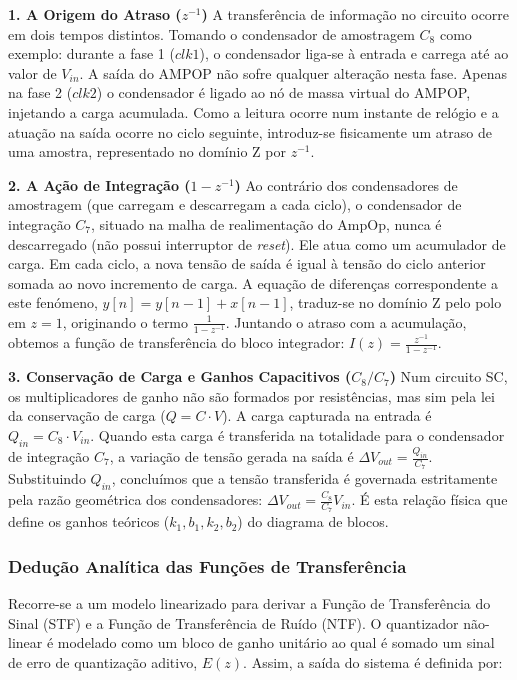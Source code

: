 \textbf{1. A Origem do Atraso ($z^{-1}$)}
A transferência de informação no circuito ocorre em dois tempos distintos. Tomando o condensador de
amostragem $C_8$ como exemplo: durante a fase 1 ($clk1$), o condensador liga-se à entrada e carrega até ao
valor de $V_{in}$. A saída do AMPOP não sofre qualquer alteração nesta fase.
Apenas na fase 2 ($clk2$) o condensador é ligado ao nó de massa virtual do AMPOP, injetando a carga acumulada.
Como a leitura ocorre num instante de relógio e a atuação na saída ocorre no ciclo seguinte, introduz-se
fisicamente um atraso de uma amostra, representado no domínio Z por $z^{-1}$.

\textbf{2. A Ação de Integração ($1 - z^{-1}$)}
Ao contrário dos condensadores de amostragem (que carregam e descarregam a cada ciclo), o condensador de
integração $C_7$, situado na malha de realimentação do AmpOp, nunca é descarregado (não possui interruptor
de \textit{reset}). Ele atua como um acumulador de carga. Em cada ciclo, a nova tensão de saída é igual à
tensão do ciclo anterior somada ao novo incremento de carga. A equação de diferenças correspondente a este
fenómeno, $y[n] = y[n-1] + x[n-1]$, traduz-se no domínio Z pelo polo em $z=1$, originando o termo
$\frac{1}{1 - z^{-1}}$. Juntando o atraso com a acumulação, obtemos a função de transferência do bloco
integrador: $I(z) = \frac{z^{-1}}{1 - z^{-1}}$.

\textbf{3. Conservação de Carga e Ganhos Capacitivos ($C_8/C_7$)}
Num circuito SC, os multiplicadores de ganho não são formados por resistências, mas sim pela lei da
conservação de carga ($Q = C \cdot V$). A carga capturada na entrada é $Q_{in} = C_8 \cdot V_{in}$.
Quando esta carga é transferida na totalidade para o condensador de integração $C_7$, a variação de
tensão gerada na saída é $\Delta V_{out} = \frac{Q_{in}}{C_7}$. Substituindo $Q_{in}$, concluímos que a
tensão transferida é governada estritamente pela razão geométrica dos condensadores:
$\Delta V_{out} = \frac{C_8}{C_7} V_{in}$. É esta relação física que define os ganhos teóricos
($k_1, b_1, k_2, b_2$) do diagrama de blocos.

\vspace{0.3cm}
\subsubsection{Dedução Analítica das Funções de Transferência}

Recorre-se a um modelo linearizado para derivar a Função de Transferência do
Sinal (STF) e a Função de Transferência de Ruído (NTF). O quantizador não-linear é modelado como um bloco
de ganho unitário ao qual é somado um sinal de erro de quantização aditivo, $E(z)$. Assim, a saída do
sistema é definida por:

